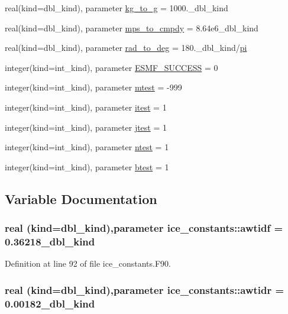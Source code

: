 \begin{DoxyCompactItemize}
\item 
real(kind=dbl\_\-kind), parameter \hyperlink{namespaceice__constants_a8521dc2c82ea56e569469e82ad4780e2}{kg\_\-to\_\-g} = 1000.\_\-dbl\_\-kind
\item 
real(kind=dbl\_\-kind), parameter \hyperlink{namespaceice__constants_a0fed58f0622b835fd2cb734144ac46c7}{mps\_\-to\_\-cmpdy} = 8.64e6\_\-dbl\_\-kind
\item 
real(kind=dbl\_\-kind), parameter \hyperlink{namespaceice__constants_a499282766889f13defe6ffd6c7aa1216}{rad\_\-to\_\-deg} = 180.\_\-dbl\_\-kind/\hyperlink{namespaceice__constants_ab88fe0d16ebc9529ef11d6fe4343c387}{pi}
\item 
integer(kind=int\_\-kind), parameter \hyperlink{namespaceice__constants_a44cb6638bc9a0baa694a335b146e14f7}{ESMF\_\-SUCCESS} = 0
\item 
integer(kind=int\_\-kind), parameter \hyperlink{namespaceice__constants_a8da957fd440b5e1713582e19da3590cf}{mtest} = -\/999
\item 
integer(kind=int\_\-kind), parameter \hyperlink{namespaceice__constants_af78b1568368337f01e89d12111f68e2e}{itest} = 1
\item 
integer(kind=int\_\-kind), parameter \hyperlink{namespaceice__constants_ac7e42098d3809e659df8da6e3fe54368}{jtest} = 1
\item 
integer(kind=int\_\-kind), parameter \hyperlink{namespaceice__constants_a27deecaf56e53c5ea7ceb62b33d530d6}{ntest} = 1
\item 
integer(kind=int\_\-kind), parameter \hyperlink{namespaceice__constants_ab190c42f5dcb2a1569301158e2066f5b}{btest} = 1
\end{DoxyCompactItemize}


\subsection{Variable Documentation}
\hypertarget{namespaceice__constants_a0b473656091f340d3c9f721dec4fad43}{
\subsubsection[{awtidf}]{\setlength{\rightskip}{0pt plus 5cm}real (kind=dbl\_\-kind),parameter {\bf ice\_\-constants::awtidf} = 0.36218\_\-dbl\_\-kind}}
\label{namespaceice__constants_a0b473656091f340d3c9f721dec4fad43}


Definition at line 92 of file ice\_\-constants.F90.\hypertarget{namespaceice__constants_aee8c086e084aac138032d1c7c0a67c6a}{
\subsubsection[{awtidr}]{\setlength{\rightskip}{0pt plus 5cm}real (kind=dbl\_\-kind),parameter {\bf ice\_\-constants::awtidr} = 0.00182\_\-dbl\_\-kind}}
\label{namespaceice__constants_aee8c086e084aac138032d1c7c0a67c6a}


